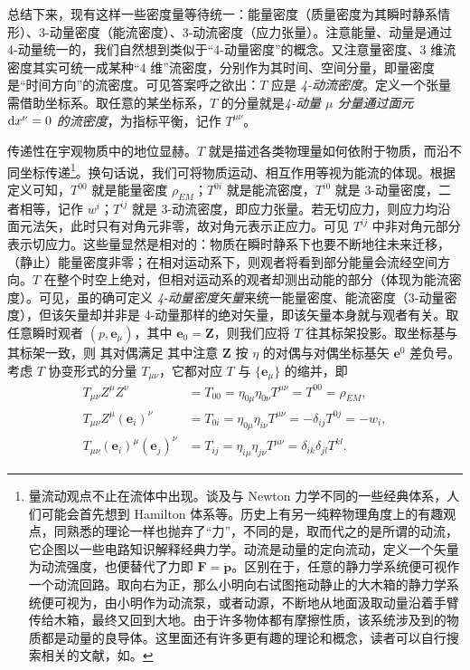 总结下来，现有这样一些密度量等待统一：能量密度（质量密度为其瞬时静系情形）、3-动量密度（能流密度）、3-动流密度（应力张量）。注意能量、动量是通过 4-动量统一的，我们自然想到类似于“4-动量密度”的概念。又注意量密度、3 维流密度其实可统一成某种“4 维”流密度，分别作为其时间、空间分量，即量密度是“时间方向”的流密度。可见答案呼之欲出：$T$ 应是 \textit{4-动流密度}。定义一个张量需借助坐标系。取任意的某坐标系，$T$ 的分量就是\textit{4-动量 $\mu$ 分量通过面元 $\dd x^\nu=0$ 的流密度}，为指标平衡，记作 $T^{\mu\nu}$。








传递性在宇观物质中的地位显赫。$T$ 就是描述各类物理量如何依附于物质，而沿不同坐标传递\footnote{量流动观点不止在流体中出现。谈及与 Newton 力学不同的一些经典体系，人们可能会首先想到 Hamilton 体系等。历史上有另一纯粹物理角度上的有趣观点，同熟悉的理论一样也抛弃了“力”，不同的是，取而代之的是所谓的动流，它企图以一些电路知识解释经典力学。动流是动量的定向流动，定义一个矢量为动流强度，也便替代了力即 $\bm F=\dot{\bm p}$。区别在于，任意的静力学系统便可视作一个动流回路。取向右为正，那么小明向右试图拖动静止的大木箱的静力学系统便可视为，由小明作为动流泵，或者动源，不断地从地面汲取动量沿着手臂传给木箱，最终又回到大地。由于许多物体都有摩擦性质，该系统涉及到的物质都是动量的良导体。这里面还有许多更有趣的理论和概念，读者可以自行搜索相关的文献，如\cite{kpk}。}。换句话说，我们可将物质运动、相互作用等视为能流的体现。根据定义可知，$T^{00}$ 就是能量密度 $\rho_{EM}$；$T^{0i}$ 就是能流密度，$T^{i0}$ 就是 3-动量密度，二者相等，记作 $w^i$；$T^{ij}$ 就是 3-动流密度，即应力张量。若无切应力，则应力均沿面元法矢，此时只有对角元非零，故对角元表示正应力。可见 $T^{ij}$ 中非对角元部分表示切应力。这些量显然是相对的：物质在瞬时静系下也要不断地往未来迁移，（静止）能量密度非零；在相对运动系下，则观者将看到部分能量会流经空间方向。$T$ 在整个时空上绝对，但相对运动系的观者却测出动能的部分（体现为能流密度）。可见，虽的确可定义 \textit{4-动量密度矢量}来统一能量密度、能流密度（3-动量密度），但该矢量却并非是 4-动量那样的绝对矢量，即该矢量本身就与观者有关。取任意瞬时观者 $(p,\bm e_\mu)$，其中 $\bm e_0=\bm Z$，则我们应将 $T$ 往其标架投影。取坐标基与其标架一致，则
其对偶满足
其中注意 $\bm Z$ 按 $\eta$ 的对偶与对偶坐标基矢 $\bm e^0$ 差负号。考虑 $T$ 协变形式的分量 $T_{\mu\nu}$，它都对应 $T$ 与 $\{\bm e_\mu\}$ 的缩并，即
\begin{align}
    T_{\mu\nu}Z^\mu Z^\nu&=T_{00}=\eta_{0\mu}\eta_{0\nu}T^{\mu\nu}=T^{00}=\rho_{EM},\\ 
    T_{\mu\nu}Z^\mu(\bm e_i)^\nu&=T_{0i}=\eta_{0\mu}\eta_{i\nu}T^{\mu\nu}=-\delta_{ij}T^{0j}=-w_i,\\
    T_{\mu\nu}(\bm e_i)^\mu(\bm e_j)^\nu&=T_{ij}=\eta_{i\mu}\eta_{j\nu}T^{\mu\nu}=\delta_{ik}\delta_{jl}T^{kl}.
\end{align}
